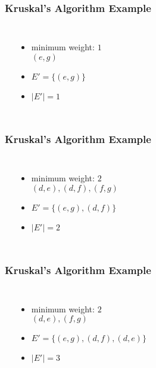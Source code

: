 \documentclass[dvipsnames]{beamer}
\begin{document}
\begin{frame}
  \frametitle{Kruskal's Algorithm Example}

  \begin{columns}
    \begin{center}
    \end{center}

    \pause
    \begin{itemize}
      \item minimum weight: $1$\\
        $(e,g)$

      \pause
      \item $E' = \{ (e,g) \}$
      \item $|E'|=1$
    \end{itemize}
  \end{columns}
\end{frame}

\begin{frame}
  \frametitle{Kruskal's Algorithm Example}

  \begin{columns}
    \begin{center}
    \end{center}

    \pause
    \begin{itemize}
      \item minimum weight: $2$\\
        $(d,e), (d,f), (f,g)$

      \pause
      \item $E' = \{ (e,g), (d,f) \}$
      \item $|E'| = 2$
    \end{itemize}
  \end{columns}
\end{frame}

\begin{frame}
  \frametitle{Kruskal's Algorithm Example}

  \begin{columns}
    \begin{center}
    \end{center}

    \pause
    \begin{itemize}
      \item minimum weight: $2$\\
        $(d,e), (f,g)$

      \pause
      \item $E' = \{ (e,g), (d,f), (d,e) \}$
      \item $|E'| = 3$
    \end{itemize}
  \end{columns}
\end{frame}
\end{document}
